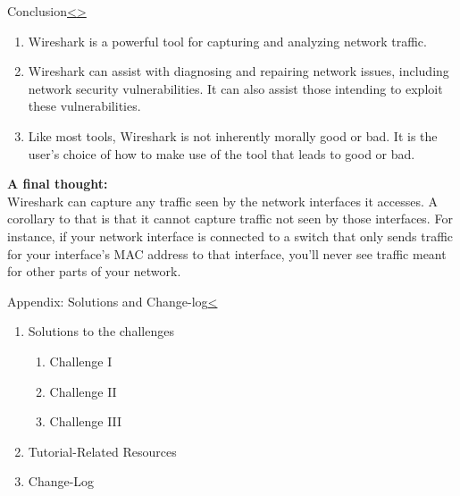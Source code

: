 \documentclass[12pt]{extarticle}
\newenvironment{instructionblock}{\Large\bgroup}{\egroup}
\newcommand{\ben}{\begin{enumerate}}
\newcommand{\een}{\end{enumerate}}
\begin{document}


\pagebreak
\begin{slide}{Conclusion}{\hyperref[slide 25]{\textless}\hyperref[slide 27]{\textgreater}}
\begin{instructionblock}
\begin{enumerate}
\item Wireshark is a powerful tool for capturing and analyzing network traffic.
\item Wireshark can assist with diagnosing and repairing network issues, including network security vulnerabilities.  It can also assist those intending to exploit these vulnerabilities.
\item Like most tools, Wireshark is not inherently morally good or bad.  It is the user's choice of how to make use of the tool that leads to good or bad.
\end{enumerate}
\end{instructionblock}
\end{slide}
\vspace{4mm}
\noindent
\textbf{A final thought:}\\ 
Wireshark can capture any traffic seen by the network interfaces it accesses.  A corollary to that is that it cannot capture traffic not seen by those interfaces.  For instance, if your network interface is connected to a switch that only sends traffic for your interface's MAC address to that interface, you'll never see traffic meant for other parts of your network.






\pagebreak	
\begin{slide}{Appendix: Solutions and Change-log}{\hyperref[slide 26]{\textless}}
	\begin{instructionblock}
		\begin{enumerate}
			\item {Solutions to the challenges}
			\ben
			\item Challenge I
			\item Challenge II
			\item Challenge III
			\een
			\item {Tutorial-Related Resources}
			\item {Change-Log}
		\end{enumerate}
	\end{instructionblock}
\end{slide}
\end{document}

